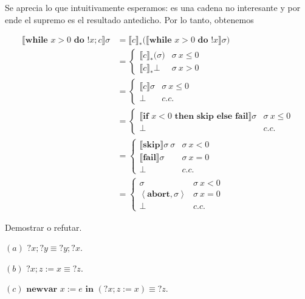 \documentclass[a4paper, 12pt]{article}
\begin{document}
Se aprecia lo que intuitivamente esperamos: es una cadena no interesante y por
ende el supremo es el resultado antedicho. Por lo tanto, obtenemos 

\begin{align*}
  \llbracket \textbf{while } x > 0 \textbf{ do } !x;c \rrbracket\sigma  
  &= \llbracket c \rrbracket_*\Big( \llbracket \textbf{while } x > 0 \textbf{ do
  } !x \rrbracket\sigma \Big)  \\ 
  &=\begin{cases}
    \llbracket c \rrbracket_* \big( \sigma \big) & \sigma ~ x \leq 0 \\ 
    \llbracket c \rrbracket_* \bot & \sigma ~ x > 0
  \end{cases} \\ 
  &=\begin{cases}
    \llbracket c \rrbracket \sigma & \sigma ~ x \leq 0 \\ 
    \bot  & c.c.
  \end{cases} \\ 
  &=\begin{cases}
    \llbracket \textbf{if } x < 0 \textbf{ then } \textbf{skip} \textbf{ else }
    \textbf{fail} \rrbracket \sigma & \sigma ~ x \leq 0 \\ 
    \bot  & c.c.
  \end{cases} \\ 
  &=\begin{cases}
    \llbracket \textbf{skip} \rrbracket\sigma ~ \sigma & \sigma ~ x < 0 \\ 
    \llbracket \textbf{fail} \rrbracket\sigma & \sigma ~ x = 0 \\ 
    \bot & c.c.
  \end{cases}  \\ 
  &=\begin{cases}
    \sigma & \sigma ~ x < 0\\ 
    \left<\textbf{abort}, \sigma \right> & \sigma ~ x = 0 \\ 
    \bot  & c.c.
  \end{cases}
\end{align*}

\pagebreak 

\begin{myframe}
  Demostrar o refutar. 

  $(a)$ $?x;?y \equiv ?y;?x$.

  $(b)$ $?x;z := x \equiv ?z$.

  $(c)$ $\textbf{newvar } x := e \textbf{ in } (?x; z := x) \equiv ?z$.

\end{myframe}
\end{document}
